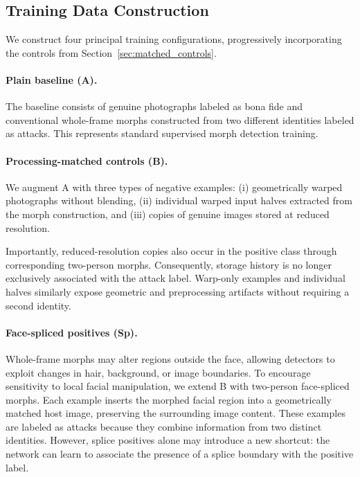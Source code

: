 \subsection{Training Data Construction}
\label{sec:training_data}

We construct four principal training configurations,
progressively incorporating the controls from
Section~\ref{sec:matched_controls}.

\paragraph{Plain baseline (A).}
The baseline consists of genuine photographs labeled
as bona fide and conventional whole-frame morphs
constructed from two different identities labeled
as attacks. This represents standard supervised
morph detection training.

\paragraph{Processing-matched controls (B).}
We augment A with three types of negative examples:
(i) geometrically warped photographs without blending,
(ii) individual warped input halves extracted from the
morph construction, and
(iii) copies of genuine images stored at reduced resolution.

Importantly, reduced-resolution copies also occur in
the positive class through corresponding two-person
morphs. Consequently, storage history is no longer
exclusively associated with the attack label.
Warp-only examples and individual halves similarly
expose geometric and preprocessing artifacts without
requiring a second identity.

\paragraph{Face-spliced positives (Sp).}
Whole-frame morphs may alter regions outside the face,
allowing detectors to exploit changes in hair, background,
or image boundaries. To encourage sensitivity to local
facial manipulation, we extend B with two-person
face-spliced morphs.
Each example inserts the morphed facial region into a
geometrically matched host image, preserving the
surrounding image content. These examples are labeled
as attacks because they combine information from
two distinct identities.
However, splice positives alone may introduce a new
shortcut: the network can learn to associate the
presence of a splice boundary with the positive label.

